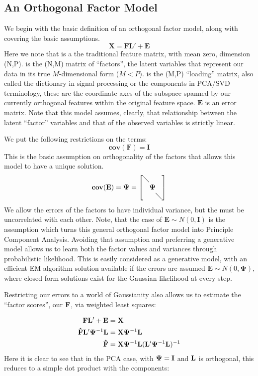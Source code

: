 \documentclass[a4paper,12pt]{article}
\makeatletter
\newcommand{\diagmat}[1]{\left[%
\begin{array}{@{}c@{}c@{}c@{}}
\diagdown &    & \\
          & #1 & \\
          &    & \diagdown
\end{array}\right]
}
\makeatother
\begin{document}
\subsection{An Orthogonal Factor Model}

We begin with the basic definition of an orthogonal factor model, along with covering the basic assumptions.
%
\begin{equation}
\mathbf{X} = \mathbf{F}\mathbf{L'} + \mathbf{E}
\end{equation}
%
Here we note that \X is a the traditional feature matrix, with mean zero, dimension (N,P). \F is the (N,M) matrix of ``factors'', the latent variables that represent our data in its true $M$-dimensional form ($M < P$). \Load  is the (M,P) ``loading'' matrix, also called the dictionary in signal processing or the components in PCA/SVD terminology, these are the coordinate axes of the subspace spanned by our currently orthogonal features within the original feature space. $\mathbf{E}$ is an error matrix. Note that this model assumes, clearly, that relationship between the latent ``factor'' variables and that of the observed variables is strictly linear.

We put the following restrictions on the terms:
%
$$
\mathbf{cov}(\mathbf{F}) = \mathbf{I}
$$
%
This is the basic assumption on orthogonality of the factors that allows this model to have a unique solution.
$$
\mathbf{cov}(\mathbf{E}) = \mathbf{\Psi} = \diagmat{\mathbf{\Psi}}
$$
%
We allow the errors of the factors to have individual variance, but the must be uncorrelated with each other. Note, that the case of $\mathbf{E} \sim N(0, \mathbf{I})$ is the assumption which turns this general orthogonal factor model into Principle Component Analysis. Avoiding that assumption and preferring a generative model allows us to learn both the factor values and variances through probabilistic likelihood. This is easily considered as a generative model, with an efficient EM algorithm solution available if the errors are assumed $\mathbf{E} \sim N(0, \mathbf{\Psi})$, where closed form solutions exist for the Gaussian likelihood at every step.

Restricting our errors to a world of Gaussianity also allows us to estimate the ``factor scores'', our $\mathbf{F}$, via weighted least squares:

\begin{align*}
\mathbf{F}\mathbf{L'} + \mathbf{E} &= \mathbf{X} \\
\mathbf{\hat{F}}\mathbf{L'}\mathbf{\Psi}^{-1}\mathbf{L} &= \mathbf{X}\mathbf{\Psi}^{-1}\mathbf{L}  \\
\mathbf{\hat{F}} &= \mathbf{X}\mathbf{\Psi}^{-1}\mathbf{L}(\mathbf{L'}\mathbf{\Psi}^{-1}\mathbf{L})^{-1}
\end{align*}
%
Here it is clear to see that in the PCA case, with $\mathbf{\Psi} = \mathbf{I}$ and $\mathbf{L}$ is orthogonal, this reduces to a simple dot product with the components:
\end{document}
